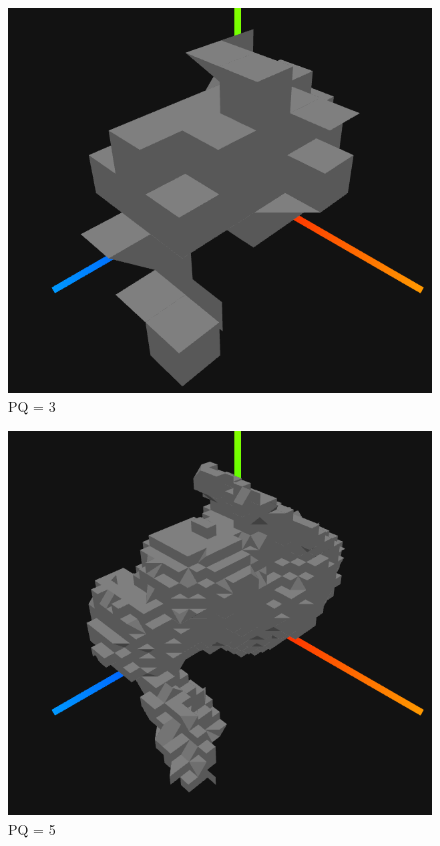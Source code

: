 \documentclass{article}
\begin{document}
\begin{figure}[h!]
\centerline{\includegraphics[scale=0.8]{./rendus/pq3.png}}
\caption{PQ = 3}
\end{figure}

\begin{figure}[h!]
\centerline{\includegraphics[scale=0.8]{./rendus/pq5.png}}
\caption{PQ = 5}
\end{figure}
\end{document}
